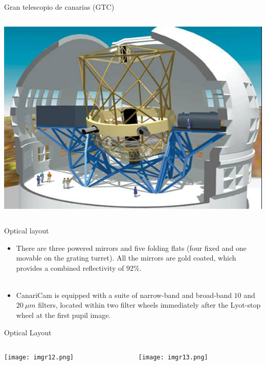 \documentclass{beamer}
\begin{document}
\begin{frame}{Gran telescopio de canarias (GTC)}
\begin{columns}
\begin{column}{0.45\textwidth}
\begin{center}
\includegraphics[height=0.41\textheight]{imgr1.png}
\end{center}
\end{column}
\end{columns}
\end{frame}




\begin{frame}{Optical layout}

\begin{itemize}
\item There are three powered mirrors and five folding flats (four fixed and one movable on the grating turret). All the mirrors are gold coated, which provides a combined reflectivity of $92\%$. \\~\\

\item CanariCam is equipped with a suite of narrow-band and broad-band $10$ and $20~\mu m$ filters,
located within two filter wheels immediately after the Lyot-stop wheel at the first pupil
image.
\end{itemize}
\end{frame}

\begin{frame}{Optical Layout}

\begin{columns}

\begin{column}{0.40\textwidth}
\begin{center}
\texttt{[image: imgr12.png]}
\end{center}
\end{column}

\begin{column}{0.45\textwidth}
\begin{center}
\texttt{[image: imgr13.png]}
\end{center}
\end{column}
\end{columns}
\end{frame}
\end{document}

